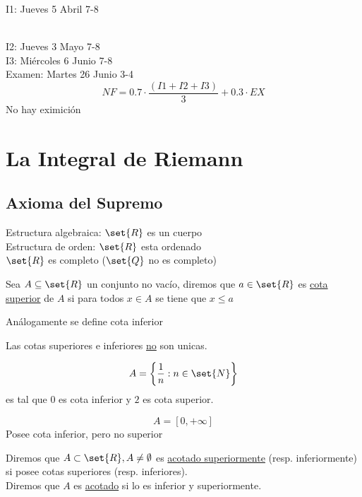 \documentclass[11pt]{book}
\begin{document}
    {\raggedright I1: Jueves 5 Abril 7-8}\\
    I2: Jueves 3 Mayo 7-8\\
    I3: Miércoles 6 Junio 7-8\\
    Examen: Martes 26 Junio 3-4\\

    \[
        NF = 0.7\cdot\frac{(I1+I2+I3)}{3}+0.3\cdot EX
    \]
    No hay eximición 
    \tableofcontents

    \part{La Integral de Riemann}
    \chapter{Axioma del Supremo}
    {\raggedleft Estructura algebraica: $\set{R}$ es un cuerpo}\\
    Estructura de orden: $\set{R}$ esta ordenado\\
    $\set{R}$ es completo ($\set{Q}$ no es completo)\\
    \begin{defn}
        Sea $A\subseteq\set{R}$ un conjunto no vacío, diremos que $a\in\set{R}$ es \underline{cota superior} de $A$ si para todos $x\in A$ se tiene que $x\leq a$
    \end{defn}
    \begin{defn}
        Análogamente se define cota inferior
    \end{defn}
    \begin{obs}
        Las cotas superiores e inferiores \underline{no} son unicas.
    \end{obs}
    \begin{ejm}
        \[A=\left\{\frac{1}{n}:n\in\set{N}\right\}\]
        es tal que $0$ es cota inferior y $2$ es cota superior.
    \end{ejm}
    \begin{ejm}
        \[A=[0,+\infty]\]
        Posee cota inferior, pero no superior
    \end{ejm}
    \begin{defn}
        Diremos que $A\subset\set{R},A\neq\emptyset$ es \underline{acotado superiormente} (resp. inferiormente) si posee cotas superiores (resp. inferiores).\\
        Diremos que $A$ es \underline{acotado} si lo es inferior y superiormente.
    \end{defn}
\end{document}
